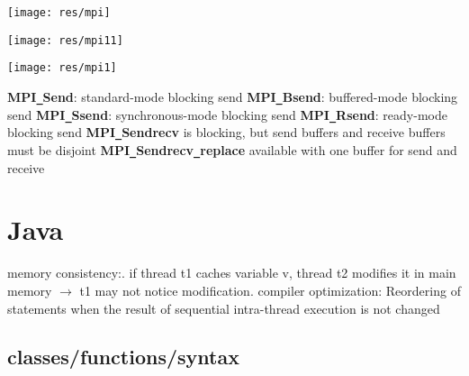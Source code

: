 \documentclass{article}
\begin{document}
\texttt{[image: res/mpi]}

\texttt{[image: res/mpi11]}

\texttt{[image: res/mpi1]}

\noindent
\textbf{MPI\texttt{\_}Send}: standard-mode blocking send\newline
\textbf{MPI\texttt{\_}Bsend}: buffered-mode blocking send\newline
\textbf{MPI\texttt{\_}Ssend}: synchronous-mode blocking send\newline
\textbf{MPI\texttt{\_}Rsend}: ready-mode blocking send\newline
\textbf{MPI\texttt{\_}Sendrecv} is blocking, but send buffers and receive buffers must be disjoint\newline
\textbf{MPI\texttt{\_}Sendrecv\texttt{\_}replace} available with one buffer for send and receive\newline

\newpage



\section{Java}
memory consistency:. if thread t1 caches variable v, thread t2 modifies it in main memory $\rightarrow$ t1 may not notice modification. compiler optimization: Reordering of statements when the result of sequential intra-thread execution is not changed\newline

\subsection{classes/functions/syntax}
\end{document}
